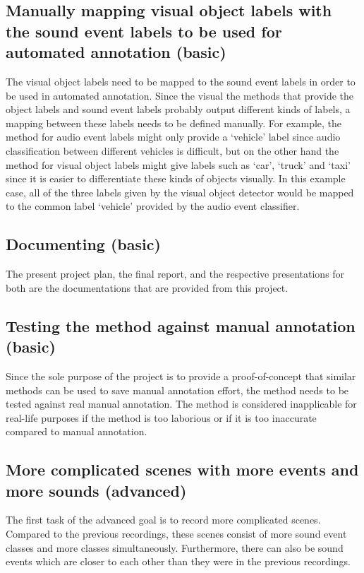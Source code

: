 \subsection{Manually mapping visual object labels with the sound event labels to be used for automated annotation (basic)}

The visual object labels need to be mapped to the sound event labels in order to be used in automated annotation.
Since the visual the methods that provide the object labels and sound event labels probably output different
kinds of labels, a mapping between these labels needs to be defined manually. For example, the method for audio
event labels might only provide a `vehicle' label since audio classification between different vehicles is 
difficult, but on the other hand the method for visual object labels might give labels such as `car', `truck' and
`taxi' since it is easier to differentiate these kinds of objects visually. In this example case, all of the 
three labels given by the visual object detector would be mapped to the common label `vehicle' provided by the
audio event classifier.

\subsection{Documenting (basic)}

The present project plan, the final report, and the respective presentations for both are the documentations
that are provided from this project.

\subsection{Testing the method against manual annotation (basic)}

Since the sole purpose of the project is to provide a proof-of-concept that similar methods can be used to save 
manual annotation effort, the method needs to be tested against real manual annotation. The method is considered
inapplicable for real-life purposes if the method is too laborious or if it is too inaccurate compared to manual
annotation.

\subsection{More complicated scenes with more events and more sounds (advanced)}

The first task of the advanced goal is to record more complicated scenes. Compared to the previous recordings, 
these scenes consist of more sound event classes and more classes simultaneously. Furthermore, there can also be
sound events which are closer to each other than they were in the previous recordings.

